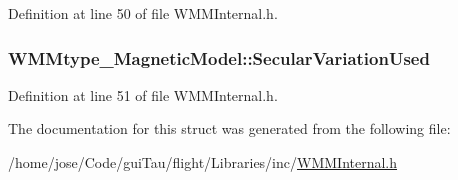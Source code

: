 Definition at line 50 of file W\-M\-M\-Internal.\-h.

\hypertarget{struct_w_m_mtype___magnetic_model_a75df8ef8af2f06cf375592712bb491d0}{
\subsubsection[{Secular\-Variation\-Used}]{ W\-M\-Mtype\-\_\-\-Magnetic\-Model\-::\-Secular\-Variation\-Used}}\label{struct_w_m_mtype___magnetic_model_a75df8ef8af2f06cf375592712bb491d0}


Definition at line 51 of file W\-M\-M\-Internal.\-h.



The documentation for this struct was generated from the following file\-:\begin{DoxyCompactItemize}
\item 
/home/jose/\-Code/gui\-Tau/flight/\-Libraries/inc/\hyperlink{_w_m_m_internal_8h}{W\-M\-M\-Internal.\-h}\end{DoxyCompactItemize}
